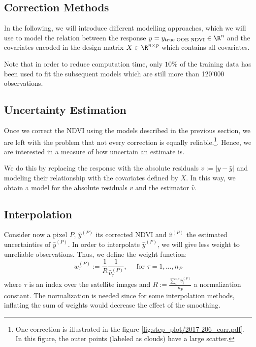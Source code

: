 {    \subsection{Correction Methods}{
        \label{sec:corr_methods}
        In the following, we will introduce different modelling approaches, which we will use to model the relation between the response $y = y_{\text{true OOB NDVI}}\in \R^n$ and the covariates encoded in the design matrix $X\in\R^{n \times p}$ which contains all covariates. 

        Note that in order to reduce computation time, only $10\%$ of the training data has been used to fit the subsequent models which are still more than 120'000 observations. 
        
    }
    
    \subsection{Uncertainty Estimation}{
        \label{sec:corr_uncertainty}
        Once we correct the NDVI using the models described in the previous section, we are left with the problem that not every correction is equally reliable.\footnote{One correction is illustrated in the figure \ref{fig:step_plot/2017-206_corr.pdf}. In this figure, the outer points (labeled as clouds) have a large scatter.}. Hence, we are interested in a measure of how uncertain an estimate is. 

        We do this by replacing the response with the absolute residuals $v := \left|y -\hat y\right|$ and modeling their relationship with the covariates defined by $X$.  In this way, we obtain a model for the absolute residuals $v$ and the estimator $\hat v$.  
    }

    \subsection{Interpolation}{
        \label{sec:corr_link}
        Consider now a pixel $P$, $\hat y^{(P)}$ its corrected NDVI and $\hat v^{(P)}$ the estimated uncertainties of $\hat y^{(P)}$. In order to interpolate $\hat y^{(P)}$, we will give less weight to unreliable observations. Thus, we define the weight function: 
        \begin{equation}
            \label{eq:corr_link}
            w^{(P)}_\tau:=\frac{1}{R} \frac{1}{\hat v^{(P)}_\tau}, 
            \quad \text{ for } \tau=1,\dots, n_P
        \end{equation}  
        where $\tau$ is an index over the satellite images and $R:=\frac{\sum_i^{n_P}\hat v^{(P)}_i}{n_P}$ a normalization constant. The normalization is needed since for some interpolation methods, inflating the sum of weights would decrease the effect of the smoothing. 
    }
}

